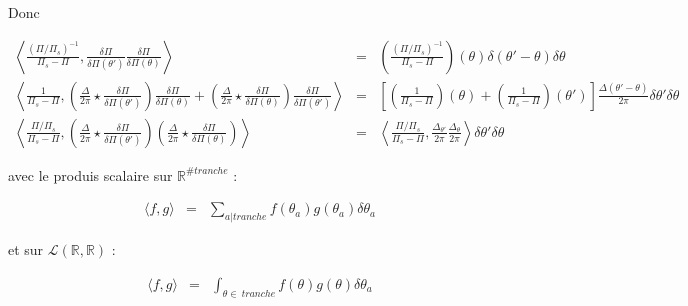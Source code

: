 Donc 

\begin{aff}
\begin{eqnarray*}
	\left \langle \frac{ (\Pi/\Pi_s)^{-1}}{\Pi_s - \Pi }  , \frac{\delta \Pi }{\delta \Pi (\theta') } \frac{\delta \Pi }{\delta \Pi (\theta)}  \right \rangle & = & \left ( \frac{ (\Pi/\Pi_s)^{-1}}{\Pi_s - \Pi }    \right )(\theta) \delta ( \theta' - \theta ) \delta \theta \\
	\left \langle \frac{ 1}{\Pi_s - \Pi }  , \left( \frac{\Delta}{2\pi} \star  \frac{\delta \Pi }{\delta \Pi (\theta') } \right )  \frac{\delta \Pi }{\delta \Pi (\theta)}   +  \left( \frac{\Delta}{2\pi} \star  \frac{\delta \Pi }{\delta \Pi (\theta) } \right )\frac{\delta \Pi }{\delta \Pi (\theta') } \right \rangle & = &  \left [ \left ( \frac{1}{\Pi_s -\Pi} \right ) (\theta)  + \left ( \frac{ 1}{\Pi_s -\Pi} \right ) (\theta')\right ]\frac{\Delta ( \theta' - \theta ) }{2\pi}  \delta \theta' \delta \theta\\
	\left \langle \frac{ \Pi/\Pi_s}{\Pi_s - \Pi }  , \left( \frac{\Delta}{2\pi} \star  \frac{\delta \Pi }{\delta \Pi (\theta') } \right ) \left( \frac{\Delta}{2\pi} \star  \frac{\delta \Pi }{\delta \Pi (\theta) } \right )  \right \rangle & = & \left \langle \frac{ \Pi/\Pi_s}{\Pi_s - \Pi }  , \frac{\Delta_{\theta'}}{2\pi}  \frac{\Delta_\theta}{2\pi}   \right \rangle \delta \theta' \delta \theta
\end{eqnarray*}
\end{aff}

avec le produis scalaire sur $\mathbb{R}^{\# tranche}$ :

\begin{eqnarray*}
	\langle f ,g \rangle & = & \sum_{a \vert tranche} f(\theta_a) g(\theta_a) \delta \theta_a 	
\end{eqnarray*}

et sur $\mathcal{L}(\mathbb{R} ,\mathbb{R})$ :

\begin{eqnarray*}
	\langle f ,g \rangle & = & \int_{\theta \in ~ tranche} f(\theta) g(\theta) \delta \theta_a 	
\end{eqnarray*}


 



